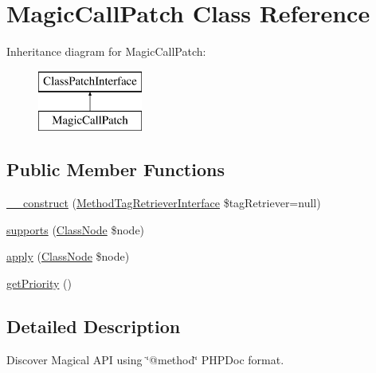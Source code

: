 \hypertarget{class_prophecy_1_1_doubler_1_1_class_patch_1_1_magic_call_patch}{}\section{Magic\+Call\+Patch Class Reference}
\label{class_prophecy_1_1_doubler_1_1_class_patch_1_1_magic_call_patch}
Inheritance diagram for Magic\+Call\+Patch\+:\begin{figure}[H]
\begin{center}
\leavevmode
\includegraphics[height=2.000000cm]{class_prophecy_1_1_doubler_1_1_class_patch_1_1_magic_call_patch}
\end{center}
\end{figure}
\subsection*{Public Member Functions}
\begin{DoxyCompactItemize}
\item 
\mbox{\hyperlink{class_prophecy_1_1_doubler_1_1_class_patch_1_1_magic_call_patch_ac5aa739ceaee6d2013e5cd109ebd313f}{\+\_\+\+\_\+construct}} (\mbox{\hyperlink{interface_prophecy_1_1_php_documentor_1_1_method_tag_retriever_interface}{Method\+Tag\+Retriever\+Interface}} \$tag\+Retriever=null)
\item 
\mbox{\hyperlink{class_prophecy_1_1_doubler_1_1_class_patch_1_1_magic_call_patch_a99b2455ac194faf79aff042c55719ac2}{supports}} (\mbox{\hyperlink{class_prophecy_1_1_doubler_1_1_generator_1_1_node_1_1_class_node}{Class\+Node}} \$node)
\item 
\mbox{\hyperlink{class_prophecy_1_1_doubler_1_1_class_patch_1_1_magic_call_patch_a62fdb697928f35fc782d6889b8fe9b8b}{apply}} (\mbox{\hyperlink{class_prophecy_1_1_doubler_1_1_generator_1_1_node_1_1_class_node}{Class\+Node}} \$node)
\item 
\mbox{\hyperlink{class_prophecy_1_1_doubler_1_1_class_patch_1_1_magic_call_patch_a1e7a3c168dcd0901a0d2669c67575b55}{get\+Priority}} ()
\end{DoxyCompactItemize}


\subsection{Detailed Description}
Discover Magical A\+PI using \char`\"{}@method\char`\"{} P\+H\+P\+Doc format.

